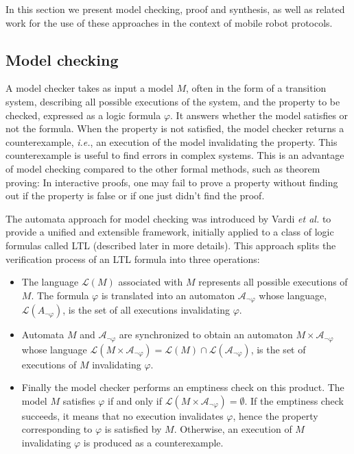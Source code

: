 In this section we present model checking, proof and synthesis, as well as related work for the use of these approaches in the context of 
mobile robot protocols.
		

\subsection{Model checking} 
A model checker takes as input a model $M$, often in the form of a transition system, describing all possible executions of the system, and the property to be checked, expressed as a logic formula $\varphi$. It answers whether the model satisfies or not the formula. When the property is not satisfied, the model checker returns a counterexample, \textit{i.e.}, an execution of the model invalidating the property. This counterexample is useful to find errors in complex systems. This is an advantage of model checking compared to the other formal methods, such as theorem proving: 
In interactive proofs, one may fail to prove a property without finding out if the property is false or if one just didn't find the proof. 

The automata approach for model checking was introduced by Vardi \textit{et al.} \cite{vardi_automata-theoretic_1986} to provide a unified and extensible framework, initially applied  to a class of logic formulas called \textsf{LTL} (described later in more details).
This approach splits the verification process of an \textsf{LTL}  formula into three operations: 
\begin{itemize}
\item The language $\mathcal{L} (M)$ associated with $M$ represents all possible executions of $M$. The formula $\varphi$ is translated into an automaton $\mathcal{A}_{\neg \varphi}$ whose language, $\mathcal{L}(A_{\neg \varphi})$, is the set of all executions invalidating $\varphi$.
\item Automata $M$ and $\mathcal{A}_{\neg \varphi}$ are synchronized to obtain an automaton $M \times \mathcal{A}_{\neg \varphi}$ whose language $\mathcal{L}(M \times \mathcal{A}_{\neg \varphi}) = \mathcal{L} (M) \cap  \mathcal{L} (\mathcal{A}_{\neg \varphi})$, is the set of executions of $M$ invalidating $\varphi$.
\item Finally the model checker performs an emptiness check on this product. The model $M$ satisfies $\varphi$ if and only if $\mathcal{L} ( M \times \mathcal{A}_{\neg \varphi}) = \emptyset$. If the emptiness check succeeds, it means that no execution invalidates $\varphi$, hence the property corresponding to $\varphi$ is satisfied by $M$. Otherwise, an execution of $M$ invalidating $\varphi$ is produced as a counterexample.
\end{itemize}		

